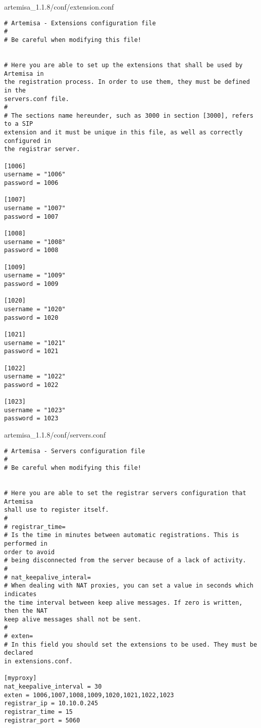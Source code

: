 \documentclass[a4paper,12pt]{report}
\newenvironment{myscriptlisting}
{\begin{list}{}{\setlength{\leftmargin}{1em}}\item\scriptsize\bfseries}
{\end{list}}
\begin{document}
artemisa\_1.1.8/conf/extension.conf
\begin{myscriptlisting}   
  \begin{verbatim}
# Artemisa - Extensions configuration file
#
# Be careful when modifying this file!


# Here you are able to set up the extensions that shall be used by Artemisa in
the registration process. In order to use them, they must be defined in the
servers.conf file.
#
# The sections name hereunder, such as 3000 in section [3000], refers to a SIP
extension and it must be unique in this file, as well as correctly configured in
the registrar server.

[1006]
username = "1006"
password = 1006

[1007]
username = "1007"
password = 1007

[1008]
username = "1008"
password = 1008

[1009]
username = "1009"
password = 1009

[1020]
username = "1020"
password = 1020

[1021]
username = "1021"
password = 1021

[1022]
username = "1022"
password = 1022

[1023]
username = "1023"
password = 1023
  \end{verbatim}
\end{myscriptlisting}

artemisa\_1.1.8/conf/servers.conf
\begin{myscriptlisting}   
  \begin{verbatim}
# Artemisa - Servers configuration file
#
# Be careful when modifying this file!


# Here you are able to set the registrar servers configuration that Artemisa
shall use to register itself.
#
# registrar_time=
# Is the time in minutes between automatic registrations. This is performed in
order to avoid
# being disconnected from the server because of a lack of activity.
#
# nat_keepalive_interal=
# When dealing with NAT proxies, you can set a value in seconds which indicates
the time interval between keep alive messages. If zero is written, then the NAT
keep alive messages shall not be sent.
#
# exten=
# In this field you should set the extensions to be used. They must be declared
in extensions.conf.

[myproxy]
nat_keepalive_interval = 30
exten = 1006,1007,1008,1009,1020,1021,1022,1023
registrar_ip = 10.10.0.245
registrar_time = 15
registrar_port = 5060
  \end{verbatim}
\end{myscriptlisting}
\end{document}
